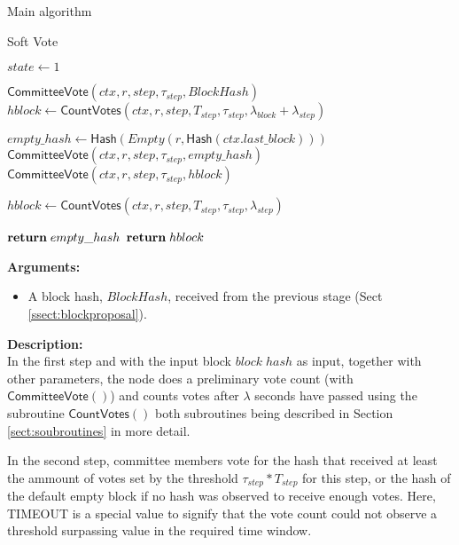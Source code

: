 \documentclass[10pt,a4paper]{article}
\begin{document}
\begin{section}{Main algorithm}
\begin{subsection}{Soft Vote}
\begin{algorithm}[H]
    \begin{algorithmic}[H]
    \State $state \gets 1$
    
    \State $\mathsf{CommitteeVote}(ctx, r, step, \tau_{step}, BlockHash)$
    \State $hblock \gets \mathsf{CountVotes}(ctx, r, step, T_{step}, \tau_{step}, \lambda_{block} + \lambda_{step})$

    \State $empty\_hash \gets \mathsf{Hash}(Empty(r, \mathsf{Hash}(ctx.last\_block)))$ 
        \State $\mathsf{CommitteeVote}(ctx, r, step, \tau_{step}, empty\_hash)$
    \Else
        {\State $\mathsf{CommitteeVote}(ctx, r, step, \tau_{step}, hblock)$}
    \EndIf\

    \State $hblock \gets \mathsf{CountVotes}(ctx, r, step, T_{step}, \tau_{step}, \lambda_{step})$ 

        {$\Return\; empty\_hash$}
        {$\Return\; hblock$}
    \EndFunction
    \end{algorithmic}
    \caption{\underline{Soft Vote}}
\end{algorithm}

\noindent \textbf{Arguments:}
\begin{itemize}
    \item A block hash, $BlockHash$, received from the previous stage (Sect \ref{ssect:blockproposal}).
  \end{itemize}

\noindent \textbf{Description:}\\
In the first step and with the input block $block\; hash$ as input, together
with other parameters, the node does a preliminary vote count (with $\mathsf{CommitteeVote}()$) and counts votes 
after $\lambda$ seconds have passed using the subroutine $\mathsf{CountVotes}()$ \-both 
subroutines being described in Section \ref{sect:soubroutines} in more detail.

In the second step, committee members vote for the hash that received at least the 
ammount of votes set by the threshold $\tau_{step} * T_{step}$ for this step, or the hash of the default empty
block if no hash was observed to receive enough votes. Here, TIMEOUT is a special value to signify that the vote count
could not observe a threshold surpassing value in the required time window.



\end{subsection}
\end{section}
\end{document}
